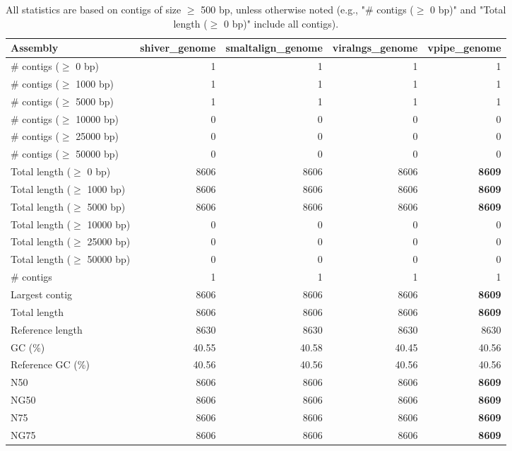 \documentclass[12pt,a4paper]{article}
\begin{document}
\begin{table}[ht]
\begin{center}
\caption{All statistics are based on contigs of size $\geq$ 500 bp, unless otherwise noted (e.g., "\# contigs ($\geq$ 0 bp)" and "Total length ($\geq$ 0 bp)" include all contigs).}
\begin{tabular}{|l*{4}{|r}|}
\hline
Assembly & shiver\_genome & smaltalign\_genome & viralngs\_genome & vpipe\_genome \\ \hline
\# contigs ($\geq$ 0 bp) & 1 & 1 & 1 & 1 \\ \hline
\# contigs ($\geq$ 1000 bp) & 1 & 1 & 1 & 1 \\ \hline
\# contigs ($\geq$ 5000 bp) & 1 & 1 & 1 & 1 \\ \hline
\# contigs ($\geq$ 10000 bp) & 0 & 0 & 0 & 0 \\ \hline
\# contigs ($\geq$ 25000 bp) & 0 & 0 & 0 & 0 \\ \hline
\# contigs ($\geq$ 50000 bp) & 0 & 0 & 0 & 0 \\ \hline
Total length ($\geq$ 0 bp) & 8606 & 8606 & 8606 & {\bf 8609} \\ \hline
Total length ($\geq$ 1000 bp) & 8606 & 8606 & 8606 & {\bf 8609} \\ \hline
Total length ($\geq$ 5000 bp) & 8606 & 8606 & 8606 & {\bf 8609} \\ \hline
Total length ($\geq$ 10000 bp) & 0 & 0 & 0 & 0 \\ \hline
Total length ($\geq$ 25000 bp) & 0 & 0 & 0 & 0 \\ \hline
Total length ($\geq$ 50000 bp) & 0 & 0 & 0 & 0 \\ \hline
\# contigs & 1 & 1 & 1 & 1 \\ \hline
Largest contig & 8606 & 8606 & 8606 & {\bf 8609} \\ \hline
Total length & 8606 & 8606 & 8606 & {\bf 8609} \\ \hline
Reference length & 8630 & 8630 & 8630 & 8630 \\ \hline
GC (\%) & 40.55 & 40.58 & 40.45 & 40.56 \\ \hline
Reference GC (\%) & 40.56 & 40.56 & 40.56 & 40.56 \\ \hline
N50 & 8606 & 8606 & 8606 & {\bf 8609} \\ \hline
NG50 & 8606 & 8606 & 8606 & {\bf 8609} \\ \hline
N75 & 8606 & 8606 & 8606 & {\bf 8609} \\ \hline
NG75 & 8606 & 8606 & 8606 & {\bf 8609} \\ \hline

\end{tabular}
\end{center}
\end{table}
\end{document}
